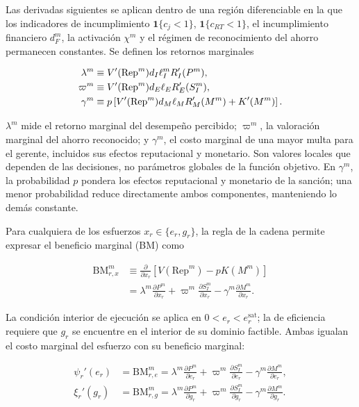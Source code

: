 Las derivadas siguientes se aplican dentro de una región diferenciable en la que los indicadores de incumplimiento \(\mathbf1\{c_j<1\}\), \(\mathbf1\{c_{RT}<1\}\), el incumplimiento financiero \(d_F^m\), la activación \(\chi^m\) y el régimen de reconocimiento del ahorro permanecen constantes. Se definen los retornos marginales

\begin{align}
\lambda^m
&\equiv
V'(\mathrm{Rep}^m)
d_I\ell_I^m
R_I'(P^m),
\notag
\\
\varpi^m
&\equiv
V'(\mathrm{Rep}^m)
d_E\ell_E
R_E'(S_I^m),
\notag
\\
\gamma^m
&\equiv
p
\left[
V'(\mathrm{Rep}^m)
d_M\ell_M
R_M'(M^m)
+
K'(M^m)
\right].
\label{eq:gamma_m}
\end{align}

\(\lambda^m\) mide el retorno marginal del desempeño percibido; \(\varpi^m\), la valoración marginal del ahorro reconocido; y \(\gamma^m\), el costo marginal de una mayor multa para el gerente, incluidos sus efectos reputacional y monetario. Son valores locales que dependen de las decisiones, no parámetros globales de la función objetivo. En \(\gamma^m\), la probabilidad \(p\) pondera los efectos reputacional y monetario de la sanción; una menor probabilidad reduce directamente ambos componentes, manteniendo lo demás constante.

Para cualquiera de los esfuerzos \(x_r\in\{e_r,g_r\}\), la regla de la cadena permite expresar el beneficio marginal (BM) como

\begin{equation}
\label{eq:derivacion_beneficio_marginal}
\begin{aligned}
\mathrm{BM}_{r,x}^m
&\equiv\frac{\partial}{\partial x_r}
\left[V(\mathrm{Rep}^m)-pK(M^m)\right]\\
&=\lambda^m\frac{\partial P^m}{\partial x_r}
+\varpi^m\frac{\partial S_I^m}{\partial x_r}
-\gamma^m\frac{\partial M^m}{\partial x_r}.
\end{aligned}
\end{equation}

La condición interior de ejecución se aplica en \(0<e_r<e_r^{\mathrm{sat}}\); la de eficiencia requiere que \(g_r\) se encuentre en el interior de su dominio factible. Ambas igualan el costo marginal del esfuerzo con su beneficio marginal:

\begin{subequations}
\label{eq:foc_esperadas}
\begin{align}
\psi_r'(e_r)
&=\mathrm{BM}_{r,e}^{m}=\lambda^m\frac{\partial P^m}{\partial e_r}
+\varpi^m\frac{\partial S_I^m}{\partial e_r}-\gamma^m\frac{\partial M^m}{\partial e_r},
\label{eq:incentivo_marginal_e}\\
\xi_r'(g_r)
&=\mathrm{BM}_{r,g}^{m}=\lambda^m\frac{\partial P^m}{\partial g_r}
+\varpi^m\frac{\partial S_I^m}{\partial g_r}-\gamma^m\frac{\partial M^m}{\partial g_r}.
\label{eq:incentivo_marginal_g}
\end{align}
\end{subequations}

